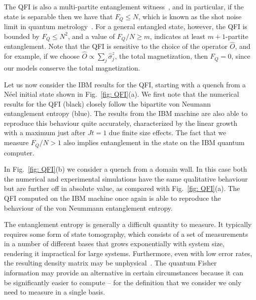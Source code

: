 \documentclass[twocolumn,showpacs,preprintnumbers,nofootinbib,amsmath,aps,pra,longbibliography,amssymb,superscriptaddress]{revtex4-1}
\begin{document}
The QFI is also a multi-partite entanglement witness~\cite{Pezze2009,Toth2012,Hyllus2012}, and in particular, if the state is separable then we have that $F_Q \leq N$, which is known as the shot noise limit in quantum metrology~\cite{Helstrom1976,Holevo1982,Giovannetti2004}. For a general entangled state, however, the QFI is bounded by $F_Q \leq N^2$, and a value of $F_Q/N \geq m$, indicates at least $m+1$-partite entanglement. Note that the QFI is sensitive to the choice of the operator $\hat{O}$, and for example, if we choose $\hat{O} \propto \sum_{j} \hat{\sigma}^z_j$, the total magnetization, then $F_Q = 0$, since our models conserve the total magnetization.

Let us now consider the IBM results for the QFI, starting with a quench from a N{\'e}el initial state shown in Fig.~\ref{fig: QFI}(a). We first note that the numerical results for the QFI (black) closely follow the bipartite von Neumann entanglement entropy (blue). The results from the IBM machine are also able to reproduce this behaviour quite accurately, characterized by the linear growth with a maximum just after $Jt=1$ due finite size effects. The fact that we measure $F_Q/N > 1$ also implies entanglement in the state on the IBM quantum computer. 

In Fig.~\ref{fig: QFI}(b) we consider a quench from a domain wall. In this case both the numerical and experimental simulations have the same qualitative behaviour but are further off in absolute value, as compared with Fig.~\ref{fig: QFI}(a). The QFI computed on the IBM machine once again is able to reproduce the behaviour of the von Neummann entanglement entropy.

The entanglement entropy is generally a difficult quantity to measure. It typically requires some form of state tomography, which consists of a set of measurements in a number of different bases that grows exponentially with system size, rendering it impractical for large systems. Furthermore, even with low error rates, the resulting density matrix may be unphysical~\cite{Smolin2012,Choo2018}. The quantum Fisher information may provide an alternative in certain circumstances because it can be significantly easier to compute -- for the definition that we consider we only need to measure in a single basis.

\end{document}
